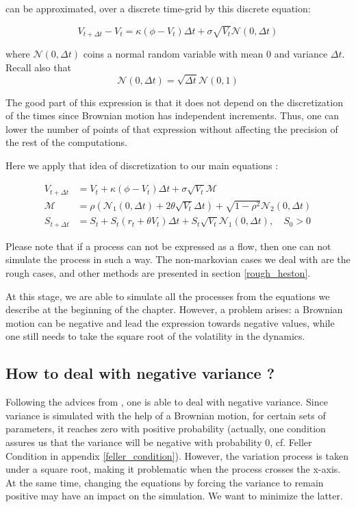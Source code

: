 can be approximated, over a discrete time-grid by this discrete equation:

$$
V_{t+\Delta t} - V_t = \kappa  ( \phi - V_t ) \Delta t + \sigma \sqrt{V_t} \mathcal N ( 0, \Delta t )  
$$

where $\mathcal N ( 0, \Delta t )  $ coins a normal random variable with mean $0$ and variance $\Delta t $. Recall also that 
$$  \mathcal N ( 0, \Delta t )  = \sqrt{ \Delta t } \mathcal N ( 0, 1 )   $$

The good part of this expression is that it does not depend on the discretization of the times since Brownian motion has independent increments. Thus, one can lower the number of points of that expression without affecting the precision of the rest of the computations. 

Here we apply that idea of discretization to our main equations :

\begin{align}
V_{t+\Delta t}  &= V_t + \kappa  ( \phi - V_t ) \Delta t + \sigma \sqrt{V_t} \mathcal M  \\
\mathcal M &= \rho  \left ( \mathcal N_1 ( 0, \Delta t )  + 2 \theta \sqrt{ V_t} \Delta t \right ) +   \sqrt{ 1 - \rho^2 } \mathcal N_2 ( 0, \Delta t ) \\
S_{t+\Delta t} &= S_t + S_t ( r_t + \theta V_t ) \Delta t + S_t \sqrt{V_t} \mathcal N_1 ( 0, \Delta t ) , \quad S_0 > 0 
\end{align}

Please note that if a process can not be expressed as a flow, then one can not simulate the process in such a way. The non-markovian cases we deal with are the rough cases, and other methods are presented in section \ref{rough_heston}.

At this stage, we are able to simulate all the processes from the equations we describe at the beginning of the chapter. However, a problem arises: a Brownian motion can be negative and lead the expression towards negative values, while one still needs to take the square root of the volatility in the dynamics. 

\subsection{How to deal with negative variance ?}

Following the advices from \cite{reflexion}, one is able to deal with negative variance. Since variance is simulated with the help of a Brownian motion, for certain sets of parameters, it reaches zero with positive probability (actually, one condition assures us that the variance will be negative with probability 0, cf. Feller Condition in appendix \ref{feller_condition}). However, the variation process is taken under a square root, making it problematic when the process crosses the x-axis. At the same time, changing the equations by forcing the variance to remain positive may have an impact on the simulation. We want to minimize the latter.

